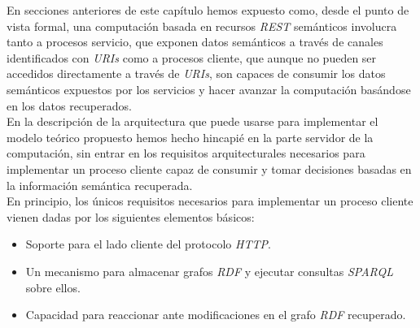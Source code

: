 En secciones anteriores de este cap\'itulo hemos expuesto como, desde el punto de vista formal, una computaci\'on basada en recursos \textit{REST} sem\'anticos involucra tanto a procesos servicio, que exponen datos sem\'anticos a trav\'es de canales identificados con \textit{URIs} como a procesos cliente, que aunque no pueden ser accedidos directamente a trav\'es de \textit{URIs}, son capaces de consumir los datos sem\'anticos expuestos por los servicios y hacer avanzar la computaci\'on bas\'andose en los datos recuperados.\\
En la descripci\'on de la arquitectura que puede usarse para implementar el modelo te\'orico propuesto hemos hecho hincapi\'e en la parte servidor de la computaci\'on, sin entrar en los requisitos arquitecturales necesarios para implementar un proceso cliente capaz de consumir y tomar decisiones basadas en la informaci\'on sem\'antica recuperada.\\
En principio, los \'unicos requisitos necesarios para implementar un proceso cliente vienen dadas por los siguientes elementos b\'asicos:

\begin{itemize}
\item Soporte para el lado cliente del protocolo \textit{HTTP}.
\item Un mecanismo para almacenar grafos \textit{RDF} y ejecutar consultas \textit{SPARQL} sobre ellos.
\item Capacidad para reaccionar ante modificaciones en el grafo \textit{RDF} recuperado.
\end{itemize}

